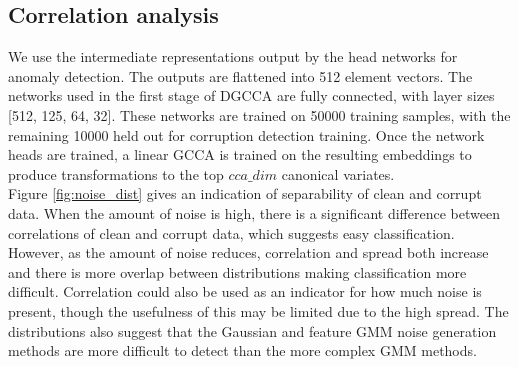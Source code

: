 \subsection{Correlation analysis}
We use the intermediate representations output by the head networks for anomaly detection. The outputs are flattened into 512 element vectors. The networks used in the first stage of DGCCA are fully connected, with layer sizes [512, 125, 64, 32]. These networks are trained on 50000 training samples, with the remaining 10000 held out for corruption detection training. Once the network heads are trained, a linear GCCA is trained on the resulting embeddings to produce transformations to the top $cca\_dim$ canonical variates.\\

Figure \ref{fig:noise_dist} gives an indication of separability of clean and corrupt data. When the amount of noise is high, there is a significant difference between correlations of clean and corrupt data, which suggests easy classification. However, as the amount of noise reduces, correlation and spread both increase and there is more overlap between distributions making classification more difficult. Correlation could also be used as an indicator for how much noise is present, though the usefulness of this may be limited due to the high spread. The distributions also suggest that the Gaussian and feature GMM noise generation methods are more difficult to detect than the more complex GMM methods.\\

